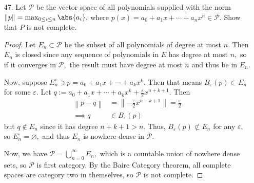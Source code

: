 \documentclass{article}
\begin{document}
\begin{itemize}
	\item[47.] Let $\mathcal P$ be the vector space of all polynomials supplied with the norm $\left\lVert p \right\rVert = \max_{0\le i\le n} \abs{a_i},$ where $p(x)=a_0+a_1x+\cdots+a_n x^n\in\mathcal P.$ Show that $P$ is not complete.
		\begin{proof}
			Let $E_n\subset\mathcal P$ be the subset of all polynomials of degree at most $n.$ Then $E_n$ is closed since any sequence of polynomials in $E$ has degree at most $n,$ so if it converges in $\mathcal P,$ the result must have degree at most $n$ and thus be in $E_n.$ 
			
			Now, suppose $E_n^\circ \ni p=a_0+a_1x+\cdots+a_k x^k.$ Then that means $B_\varepsilon(p)\subset E_n$ for some $\varepsilon.$ Let $q:=a_0+a_1x+\cdots+a_kx^k + \frac{\varepsilon}{2}x^{n+k+1}.$ Then
			\begin{align*}
				\left\lVert p-q \right\rVert &= \left\lVert -\frac{\varepsilon}{2} x^{n+k+1} \right\rVert = \frac{\varepsilon}{2} \\
				\implies q&\in B_\varepsilon(p)
			\end{align*}
			but $q\notin E_n$ since it has degree $n+k+1>n.$ Thus, $B_\varepsilon(p)\not\subset E_n$ for any $\varepsilon,$ so $E_n^\circ=\varnothing,$ and thus $E_n$ is nowhere dense in $\mathcal P.$

			Now, we have $\mathcal P = \bigcup_{n=0}^\infty E_n,$ which is a countable union of nowhere dense sets, so $\mathcal P$ is first category. By the Baire Category theorem, all complete spaces are category two in themselves, so $\mathcal P$ is not complete.
		\end{proof}
		
\end{itemize}
\end{document}
